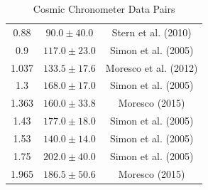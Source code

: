 \documentclass{book}
\begin{document}
\begin{table}[h!]
\begin{tabular}{ccc}
			0.88 & $90.0 \pm 40.0$ & Stern et al. (2010) \\
			0.9 & $117.0 \pm 23.0$ & Simon et al. (2005) \\
			1.037 & $133.5 \pm 17.6$ & Moresco et al. (2012) \\
			1.3 & $168.0 \pm 17.0$ & Simon et al. (2005) \\
			1.363 & $160.0 \pm 33.8$ & Moresco (2015) \\
			1.43 & $177.0 \pm 18.0$ & Simon et al. (2005) \\
			1.53 & $140.0 \pm 14.0$ & Simon et al. (2005) \\
			1.75 & $202.0 \pm 40.0$ & Simon et al. (2005) \\
			1.965 & $186.5 \pm 50.6$ & Moresco (2015) \\ \hline\hline
		\end{tabular}
		\normalsize
		\caption{Cosmic Chronometer Data Pairs}
		\label{CCH_DataSet}
	\end{table}
	
\end{document}
